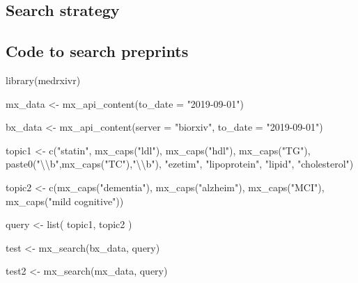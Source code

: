\documentclass[a4paper, twoside]{templates/ociamthesis}
\newenvironment{Shaded}{\begin{snugshade}}{\end{snugshade}}
\newcommand{\AttributeTok}[1]{\textcolor[rgb]{0.77,0.63,0.00}{#1}}
\newcommand{\FunctionTok}[1]{\textcolor[rgb]{0.00,0.00,0.00}{#1}}
\newcommand{\NormalTok}[1]{#1}
\newcommand{\OtherTok}[1]{\textcolor[rgb]{0.56,0.35,0.01}{#1}}
\newcommand{\SpecialCharTok}[1]{\textcolor[rgb]{0.00,0.00,0.00}{#1}}
\newcommand{\StringTok}[1]{\textcolor[rgb]{0.31,0.60,0.02}{#1}}
\renewenvironment{Shaded}
{
  \vspace{4pt}%
  \begin{snugshade}%
}{%
  \end{snugshade}%
  \vspace{4pt}%
}
\begin{document}
\hypertarget{appendix-search-strategy}{%
\subsection{Search strategy}\label{appendix-search-strategy}}

\hypertarget{appendix-medrxivr-code}{%
\subsection{Code to search preprints}\label{appendix-medrxivr-code}}

\begin{Shaded}
\begin{Highlighting}[]
\FunctionTok{library}\NormalTok{(medrxivr)}

\NormalTok{mx\_data }\OtherTok{\textless{}{-}} \FunctionTok{mx\_api\_content}\NormalTok{(}\AttributeTok{to\_date =} \StringTok{"2019{-}09{-}01"}\NormalTok{)}

\NormalTok{bx\_data }\OtherTok{\textless{}{-}} \FunctionTok{mx\_api\_content}\NormalTok{(}\AttributeTok{server =} \StringTok{"biorxiv"}\NormalTok{,}
                                    \AttributeTok{to\_date =} \StringTok{"2019{-}09{-}01"}\NormalTok{)}

\NormalTok{topic1 }\OtherTok{\textless{}{-}} \FunctionTok{c}\NormalTok{(}\StringTok{"statin"}\NormalTok{,}
            \FunctionTok{mx\_caps}\NormalTok{(}\StringTok{"ldl"}\NormalTok{),}
            \FunctionTok{mx\_caps}\NormalTok{(}\StringTok{"hdl"}\NormalTok{),}
            \FunctionTok{mx\_caps}\NormalTok{(}\StringTok{"TG"}\NormalTok{),}
            \FunctionTok{paste0}\NormalTok{(}\StringTok{"}\SpecialCharTok{\textbackslash{}\textbackslash{}}\StringTok{b"}\NormalTok{,}\FunctionTok{mx\_caps}\NormalTok{(}\StringTok{"TC"}\NormalTok{),}\StringTok{"}\SpecialCharTok{\textbackslash{}\textbackslash{}}\StringTok{b"}\NormalTok{),}
            \StringTok{"ezetim"}\NormalTok{,}
            \StringTok{"lipoprotein"}\NormalTok{,}
            \StringTok{"lipid"}\NormalTok{,}
            \StringTok{"cholesterol"}\NormalTok{)}

\NormalTok{topic2 }\OtherTok{\textless{}{-}} \FunctionTok{c}\NormalTok{(}\FunctionTok{mx\_caps}\NormalTok{(}\StringTok{"dementia"}\NormalTok{),}
            \FunctionTok{mx\_caps}\NormalTok{(}\StringTok{"alzheim"}\NormalTok{),}
            \FunctionTok{mx\_caps}\NormalTok{(}\StringTok{"MCI"}\NormalTok{),}
            \FunctionTok{mx\_caps}\NormalTok{(}\StringTok{"mild cognitive"}\NormalTok{))}

\NormalTok{query }\OtherTok{\textless{}{-}} \FunctionTok{list}\NormalTok{(}
\NormalTok{  topic1,}
\NormalTok{  topic2}
\NormalTok{)}

\NormalTok{test }\OtherTok{\textless{}{-}} \FunctionTok{mx\_search}\NormalTok{(bx\_data, query)}


\NormalTok{test2 }\OtherTok{\textless{}{-}} \FunctionTok{mx\_search}\NormalTok{(mx\_data, query)}
\end{Highlighting}
\end{Shaded}
\end{document}
